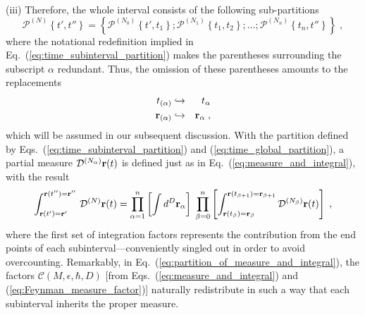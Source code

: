 \documentclass[a4paper,preprint,draft,showpacs,amsmath,amsfonts,amssymb,aps,prd]{revtex4}%
\begin{document}
(iii) Therefore, the whole interval consists of the following sub-partitions
\begin{equation}
{\mathcal P}^{(N) } 
\left\{
t',t''
\right\}
=
\left\{
{\mathcal P}^{(N_{ 0}) } 
\left\{
t', t_{1}
\right\};
{\mathcal P}^{(N_{ 1}) } 
\left\{
t_{1}, t_{2}
\right\};
\ldots
;
{\mathcal P}^{(N_{ n}) } 
\left\{
t_{n}, t''
\right\}
\right\}
\;  ,
\label{eq:time_global_partition}
\end{equation}
where the notational redefinition implied in Eq.~(\ref{eq:time_subinterval_partition})
makes the parentheses surrounding the subscript $\alpha$ 
redundant. Thus, 
 the omission of these parentheses amounts to the replacements
\begin{eqnarray}
t_{(\alpha) } 
& \hookrightarrow &
t_{\alpha }
\\
{\bf r}_{(\alpha)}
& \hookrightarrow &
{\bf r}_{\alpha}
\;  ,
\end{eqnarray}
which will be assumed in our subsequent discussion.
With the partition defined by  Eqs.~(\ref{eq:time_subinterval_partition})
and (\ref{eq:time_global_partition}),
a partial measure
${\cal D} ^{(N_{\alpha})} {\bf r} (t) $ is 
defined just as in Eq.~(\ref{eq:measure_and_integral}), with the result
\begin{equation}
\int_{  {\bf r} (t')  = {\bf r}'  }^{  {\bf r} (t'')  = {\bf r}'' }
\,
{\cal D} ^{(N)} {\bf r} (t) 
=
\prod_{\alpha=1}^{n}
 \left[ \int
 d^{D} 
{\bf r}_{\alpha}
\right]
\;
\prod_{\beta=0}^{n} 
\left[
\int_{  {\bf r} (t_{\beta})  = {\bf r}_{\beta}  }^{  {\bf r} (t_{\beta+1})  = {\bf r}_{\beta+1} }
{\cal D} ^{(N_{\beta})} {\bf r} (t) 
\right]
\;  ,
\label{eq:partition_of_measure_and_integral}
\end{equation}
where
the first set of integration factors represents the contribution from 
the end points
of each subinterval---conveniently singled out  
in order to avoid overcounting.
Remarkably,
in Eq.~(\ref{eq:partition_of_measure_and_integral}),
the factors ${\mathcal C} (M,\epsilon,\hbar,D) $
[from Eqs.~(\ref{eq:measure_and_integral}) and
(\ref{eq:Feynman_measure_factor})]
naturally redistribute in such a way that each subinterval inherits the proper measure.
\end{document}

